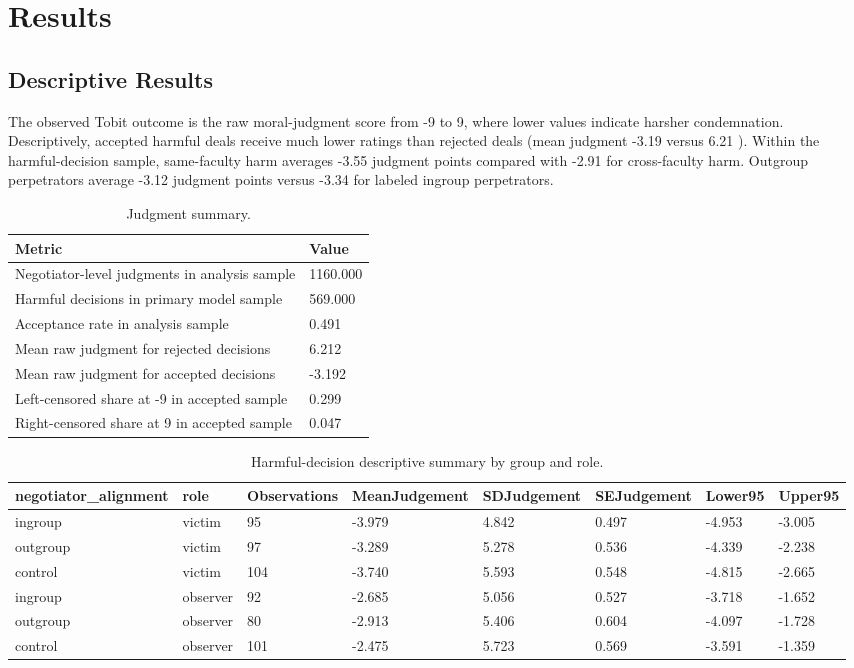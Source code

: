 \documentclass[11pt]{article}
\begin{document}
\section{Results}
\subsection{Descriptive Results}
The observed Tobit outcome is the raw moral-judgment score from -9 to 9, where lower values indicate harsher condemnation. Descriptively, accepted harmful deals receive much lower ratings than rejected deals (mean judgment -3.19 versus 6.21 ). Within the harmful-decision sample, same-faculty harm averages -3.55 judgment points compared with -2.91 for cross-faculty harm. Outgroup perpetrators average -3.12 judgment points versus -3.34 for labeled ingroup perpetrators.
\begin{table}[H]
\centering
\caption{Judgment summary.}
\label{tab:judgement_summary}
\begin{tabular}{ll}
\toprule
Metric & Value \\
\midrule
Negotiator-level judgments in analysis sample & 1160.000 \\
Harmful decisions in primary model sample & 569.000 \\
Acceptance rate in analysis sample & 0.491 \\
Mean raw judgment for rejected decisions & 6.212 \\
Mean raw judgment for accepted decisions & -3.192 \\
Left-censored share at -9 in accepted sample & 0.299 \\
Right-censored share at 9 in accepted sample & 0.047 \\
\bottomrule
\end{tabular}
\end{table}
\begin{table}[H]
\centering
\caption{Harmful-decision descriptive summary by group and role.}
\label{tab:harmful_summary}
\begin{tabular}{llllllll}
\toprule
negotiator\_alignment & role & Observations & MeanJudgement & SDJudgement & SEJudgement & Lower95 & Upper95 \\
\midrule
ingroup & victim & 95 & -3.979 & 4.842 & 0.497 & -4.953 & -3.005 \\
outgroup & victim & 97 & -3.289 & 5.278 & 0.536 & -4.339 & -2.238 \\
control & victim & 104 & -3.740 & 5.593 & 0.548 & -4.815 & -2.665 \\
ingroup & observer & 92 & -2.685 & 5.056 & 0.527 & -3.718 & -1.652 \\
outgroup & observer & 80 & -2.913 & 5.406 & 0.604 & -4.097 & -1.728 \\
control & observer & 101 & -2.475 & 5.723 & 0.569 & -3.591 & -1.359 \\
\bottomrule
\end{tabular}
\end{table}
\end{document}
